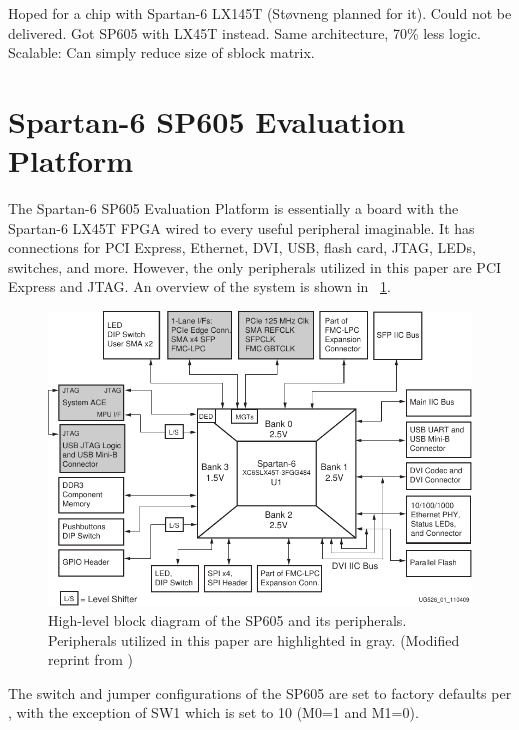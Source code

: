 \TODO
Hoped for a chip with Spartan-6 LX145T (Støvneng planned for it).
Could not be delivered.
Got SP605 with LX45T instead.
Same architecture, 70\% less logic.
Scalable: Can simply reduce size of sblock matrix.

\section{Spartan-6 SP605 Evaluation Platform}

The Spartan-6 SP605 Evaluation Platform is essentially a board with the Spartan-6 LX45T FPGA wired to every useful peripheral imaginable.
It has connections for PCI Express\footnotemark, Ethernet, DVI, USB, flash card, JTAG, LEDs, switches, and more.
However, the only peripherals utilized in this paper are PCI Express and JTAG.
An overview of the system is shown in \figurename~\ref{fig:sp605}.


\begin{figure}[!ht]
    \centering
    \includegraphics[width=\textwidth]{figures/sp605-modified}
    \caption[SP605]{
        High-level block diagram of the SP605 and its peripherals.
        Peripherals utilized in this paper are highlighted in gray.
        (Modified reprint from \cite{ug526})
    }
    \label{fig:sp605}
\end{figure}

The switch and jumper configurations of the SP605 are set to factory defaults per \cite{ug526}, with the exception of SW1 which is set to 10 (M0=1 and M1=0).

